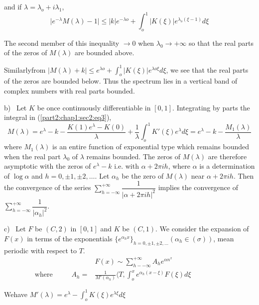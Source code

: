and if $\lambda = \lambda_o + i \lambda_1$,
$$
\big|e^{- \lambda} M(\lambda) - 1 \big| \leq \big| k \big| e^{-
  \lambda o} + \int^1_o \big| K (\xi) \big| e^{\lambda_o (\xi - 1)} d
\xi 
$$

The second member of this inequality $\to 0$ when $\lambda_0 \to +
\infty$ so that the real parts of the zeros of $M(\lambda)$ are
bounded above. 

Similarly\pageoriginale from $\big|M(\lambda) + k \big| \le e^{\lambda o} +
\int^{1}_o \big| K(\xi) \big| e^{\lambda o \xi} d \xi$, we see that
the real parts of the zeros are bounded below. Thus the spectrum lies in
a vertical band of complex numbers with real parts bounded. 

b)~  Let $K$ be once continuously differentiable in $[0,
  1]$. Integrating by parts the integral in (\ref{part2:chap1:sec2:eq3}), 
$$
M(\lambda) = e^\lambda - k - \frac{K(1)e^\lambda - K(0)}{\lambda} +
\frac{1}{\lambda} \int^1_o K' (\xi) e^\lambda d \xi = e^\lambda - k -
\frac{M_1 (\lambda)}{\lambda} 
$$
where $M_1(\lambda)$ is an entire function of exponential type which
remains bounded when the real part $\lambda_0$ of $\lambda$ remains
bounded. The zeros of $M(\lambda)$ are therefore asymptotic with the
zeros of $e^\lambda - k$ i.e. with $\alpha + 2 \pi ih$, where $\alpha$
is a determination of $\log \alpha$ and $h = 0, \pm 1, \pm 2,
\ldots$. Let $\alpha_h$ be the zero of $M(\lambda)$ near $\alpha + 2
\pi ih$. Then the convergence of the series $\sum\limits^{ +
  \infty}_{h = - \infty} \dfrac{1}{|\alpha + 2 \pi ih|^2}$ implies the
convergence of $\sum\limits_{h = - \infty}^{ + \infty }
\dfrac{1}{|\alpha_h|^2}$. 

c)~ Let $F$ be $(C, 2)$ in $[0, 1]$ and $K$ be $(C, 1)$. We
consider the expansion of $F(x)$ in terms of the exponentials
$\big\{e^{\alpha_h x} \big\}_{h = 0, \pm 1, \pm 2, \ldots} (\alpha_h
\in (\sigma))$, mean periodic with respect to $T$. 
\begin{align*}
  & F(x) \sim \sum_{h - - \infty}^{+ \infty} A_h e^{\alpha n^x}
  \tag{4}\label{part2:chap1:sec2:eq4}\\ 
  \text{where }\hspace{1cm}  A_h = & \frac{1}{M' (\alpha_h)} \langle T,
  \int^x_o e^{\alpha_ h(x - \xi)} F (\xi) d \xi\hspace{2cm}
  \tag{5}\label{part2:chap1:sec2:eq5} 
\end{align*}

We\pageoriginale have \qquad \qquad $M' (\lambda) = e^\lambda - \int^1_o K (\xi)
e^{\lambda \xi} d \xi$ 


